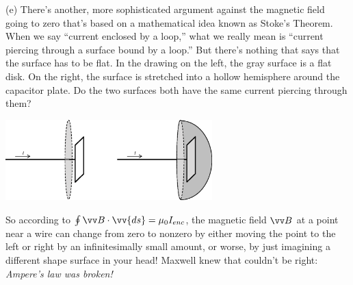 (e)  There's another, more sophisticated argument against the magnetic field going to zero that's based on a mathematical idea known as Stoke's Theorem.  When we say ``current enclosed by a loop,'' what we really mean is ``current piercing through a surface bound by a loop.'' But there's nothing that says that the surface has to be flat.  In the drawing on the left, the gray surface is a flat disk.  On the right, the surface is stretched into a hollow hemisphere around the capacitor plate.  Do the two surfaces both have the same current piercing through them?
\begin{center}
\vspace{-0.1in}
    \includegraphics[width=0.6\textwidth]{deriving_em_waves/two_surfaces.eps}
\vspace{-0.1in}
\end{center}

So according to $\oint \vv B \cdot \vv{ds} = \mu_0I_{enc}$, the magnetic field $\vv B$ at a point near a wire can change from zero to nonzero by either moving the point to the left or right by an infinitesimally small amount, or worse, by just imagining a different shape surface in your head!  Maxwell knew that couldn't be right: \textit{Ampere's law was broken!}

